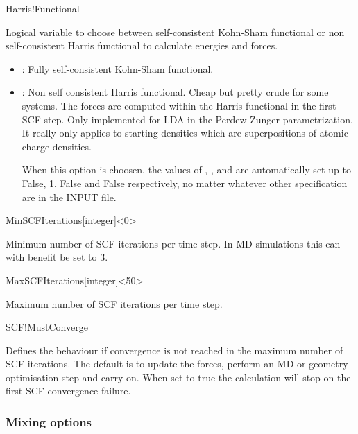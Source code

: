 \begin{fdflogicalF}{Harris!Functional}
  
  Logical variable to choose between self-consistent Kohn-Sham
  functional or non self-consistent Harris functional to calculate
  energies and forces.
  \begin{itemize}
    \item \fdffalse: Fully self-consistent Kohn-Sham functional.
    \item \fdftrue: Non self consistent Harris functional. Cheap but
    pretty crude for some systems. The forces are computed within the
    Harris functional in the first SCF step. Only implemented for LDA in
    the Perdew-Zunger parametrization. It really only applies to starting
    densities which are superpositions of atomic charge densities.

    When this option is choosen, the values of ,
    ,  and  are automatically set
    up to False, 1, False and False respectively, no matter whatever other
    specification are in the INPUT file.
  \end{itemize}

\end{fdflogicalF}

\begin{fdfentry}{MinSCFIterations}[integer]<0>

  Minimum number of SCF iterations per time step. In MD
  simulations this can with benefit be set to 3.
  
\end{fdfentry}

\begin{fdfentry}{MaxSCFIterations}[integer]<50>

  Maximum number of SCF iterations per time step. 
  
\end{fdfentry}

\begin{fdflogicalF}{SCF!MustConverge}

  Defines the behaviour if convergence is not reached in the maximum
  number of SCF iterations. The default is to update the forces, perform
  an MD or geometry optimisation step and carry on. When set to true
  the calculation will stop on the first SCF convergence failure.
  
\end{fdflogicalF}


\subsubsection{Mixing options}

